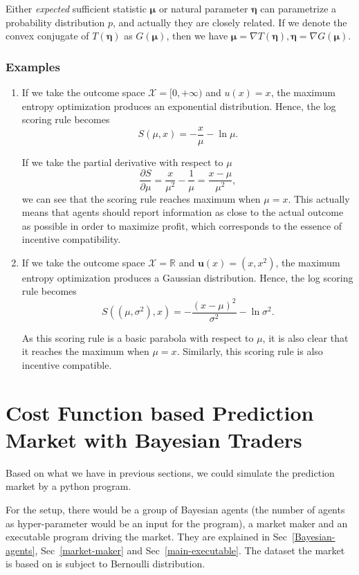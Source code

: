 \documentclass[12pt]{article}
\begin{document}
Either \textit{expected} sufficient statistic $\bm{\mu}$ or natural parameter $\bm{\eta}$ can parametrize a probability distribution $p$, and actually they are closely related. If we denote the convex conjugate of $T(\bm{\eta})$ as $G(\bm{\mu})$, then we have $\bm{\mu}=\nabla T(\bm{\eta}),\bm{\eta}=\nabla G(\bm{\mu})$.
\subsubsection{Examples}
\begin{enumerate}
    \item If we take the outcome space $\mathcal{X}=[0,+\infty)$ and $u(x)=x$, the maximum entropy optimization produces an exponential distribution. Hence, the log scoring rule becomes
          \[S(\mu,x)=-\frac{x}{\mu}-\ln\mu.\]

          If we take the partial derivative with respect to $\mu$
          \[\frac{\partial S}{\partial\mu}=\frac{x}{\mu^2}-\frac{1}{\mu}=\frac{x-\mu}{\mu^2},\]
          we can see that the scoring rule reaches maximum when $\mu=x$. This actually means that agents should report information as close to the actual outcome as possible in order to maximize profit, which corresponds to the essence of incentive compatibility.
    \item If we take the outcome space $\mathcal{X}=\mathbb{R}$ and $\mathbf{u}(x)=(x,x^2)$, the maximum entropy optimization produces a Gaussian distribution. Hence, the log scoring rule becomes
          \[S((\mu,\sigma^2),x)=-\frac{(x-\mu)^2}{\sigma^2}-\ln\sigma^2.\]

          As this scoring rule is a basic parabola with respect to $\mu$, it is also clear that it reaches the maximum when $\mu=x$. Similarly, this scoring rule is also incentive compatible.
\end{enumerate}

\section{Cost Function based Prediction Market with Bayesian Traders}
Based on what we have in previous sections, we could simulate the prediction market by a python program.

For the setup, there would be a group of Bayesian agents (the number of agents as hyper-parameter would be an input for the program), a market maker and an executable program driving the market. They are explained in Sec~\ref{Bayesian-agents}, Sec~\ref{market-maker} and Sec~\ref{main-executable}. The dataset the market is based on is subject to Bernoulli distribution.
\end{document}
